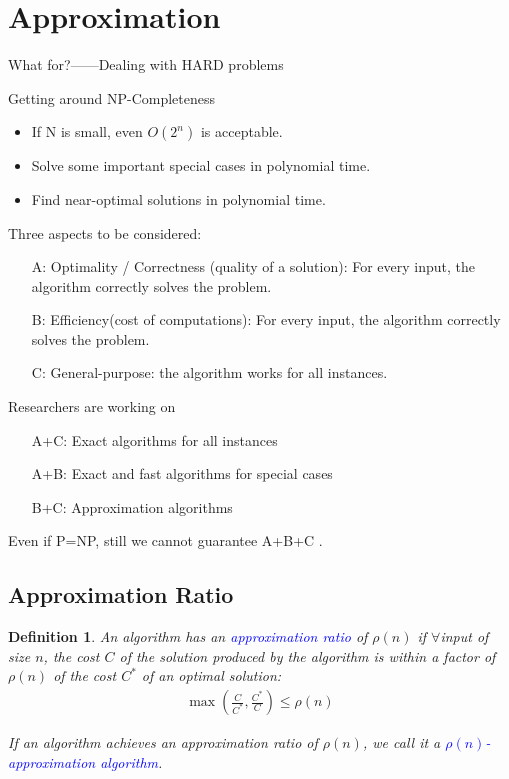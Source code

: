 \documentclass{article}
\newtheorem*{Definition}{Definition}
\begin{document}
\newpage

\section{Approximation}
What for?——Dealing with HARD problems\par
\hspace*{\fill}\par
Getting around NP-Completeness
\begin{itemize}
    \item If N is small, even $O(2^n)$ is acceptable.
    \item Solve some important special cases in polynomial time.
    \item Find near-optimal solutions in polynomial time.
\end{itemize}\par

\hspace*{\fill}\par

Three aspects to be considered:
\begin{itemize}
    \item [A:] Optimality / Correctness (quality of a solution): For every input, the algorithm correctly solves the problem.
    \item [B:] Efficiency(cost of computations): For every input, the algorithm correctly solves the problem.
    \item [C:] General-purpose: the algorithm works for all instances.
\end{itemize}\par

\hspace*{\fill}\par

Researchers are working on
\begin{itemize}
    \item [A+C:] Exact algorithms for all instances
    \item [A+B:] Exact and fast algorithms for special cases
    \item [B+C:] Approximation algorithms 
\end{itemize}\par
Even if P=NP, still we cannot guarantee A+B+C .

\subsection{Approximation Ratio}
\begin{Definition}
    An algorithm has an \textcolor{blue}{approximation ratio} of  $\rho(n)$ if $\forall$input of size $n$, the cost $C$ of the solution produced by the algorithm is within a factor of $\rho(n)$ of the cost $C^*$ of an optimal solution:
    \begin{align*}
        \max\left( \frac{C}{C^*}, \frac{C^*}{C} \right)\le \rho(n)
    \end{align*}

    If an algorithm achieves an approximation ratio of $\rho(n)$, we call it a \textcolor{blue}{$\rho(n)$-approximation algorithm}.
\end{Definition}
\end{document}
